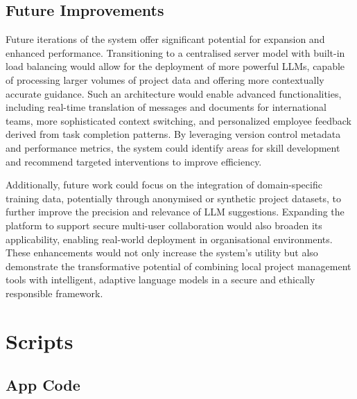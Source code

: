 \documentclass{report}
\begin{document}
\section{Future Improvements}
Future iterations of the system offer significant potential for expansion and enhanced performance. Transitioning to a centralised server model with built-in load balancing would allow for the deployment of more powerful LLMs, capable of processing larger volumes of project data and offering more contextually accurate guidance. Such an architecture would enable advanced functionalities, including real-time translation of messages and documents for international teams, more sophisticated context switching, and personalized employee feedback derived from task completion patterns. By leveraging version control metadata and performance metrics, the system could identify areas for skill development and recommend targeted interventions to improve efficiency.

Additionally, future work could focus on the integration of domain-specific training data, potentially through anonymised or synthetic project datasets, to further improve the precision and relevance of LLM suggestions. Expanding the platform to support secure multi-user collaboration would also broaden its applicability, enabling real-world deployment in organisational environments. These enhancements would not only increase the system's utility but also demonstrate the transformative potential of combining local project management tools with intelligent, adaptive language models in a secure and ethically responsible framework.



\printbibliography 

\appendix
\chapter{Scripts}
\section{App Code}
\end{document}
